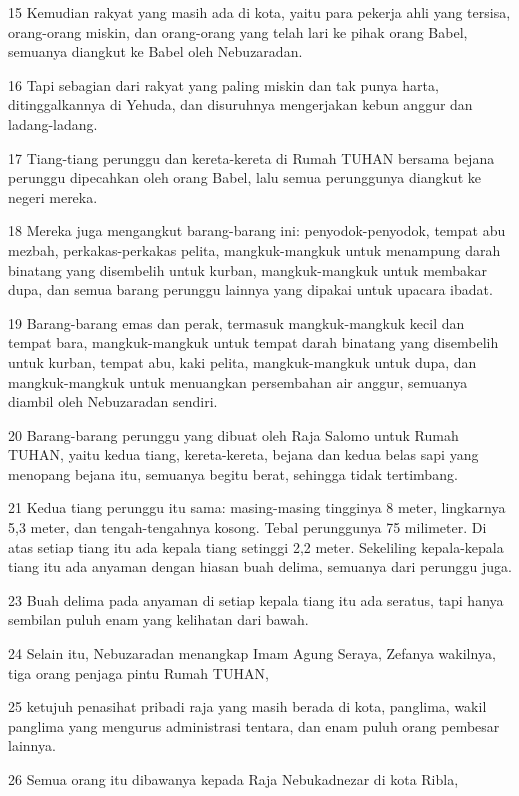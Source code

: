 \par 15 Kemudian rakyat yang masih ada di kota, yaitu para pekerja ahli yang tersisa, orang-orang miskin, dan orang-orang yang telah lari ke pihak orang Babel, semuanya diangkut ke Babel oleh Nebuzaradan.
\par 16 Tapi sebagian dari rakyat yang paling miskin dan tak punya harta, ditinggalkannya di Yehuda, dan disuruhnya mengerjakan kebun anggur dan ladang-ladang.
\par 17 Tiang-tiang perunggu dan kereta-kereta di Rumah TUHAN bersama bejana perunggu dipecahkan oleh orang Babel, lalu semua perunggunya diangkut ke negeri mereka.
\par 18 Mereka juga mengangkut barang-barang ini: penyodok-penyodok, tempat abu mezbah, perkakas-perkakas pelita, mangkuk-mangkuk untuk menampung darah binatang yang disembelih untuk kurban, mangkuk-mangkuk untuk membakar dupa, dan semua barang perunggu lainnya yang dipakai untuk upacara ibadat.
\par 19 Barang-barang emas dan perak, termasuk mangkuk-mangkuk kecil dan tempat bara, mangkuk-mangkuk untuk tempat darah binatang yang disembelih untuk kurban, tempat abu, kaki pelita, mangkuk-mangkuk untuk dupa, dan mangkuk-mangkuk untuk menuangkan persembahan air anggur, semuanya diambil oleh Nebuzaradan sendiri.
\par 20 Barang-barang perunggu yang dibuat oleh Raja Salomo untuk Rumah TUHAN, yaitu kedua tiang, kereta-kereta, bejana dan kedua belas sapi yang menopang bejana itu, semuanya begitu berat, sehingga tidak tertimbang.
\par 21 Kedua tiang perunggu itu sama: masing-masing tingginya 8 meter, lingkarnya 5,3 meter, dan tengah-tengahnya kosong. Tebal perunggunya 75 milimeter. Di atas setiap tiang itu ada kepala tiang setinggi 2,2 meter. Sekeliling kepala-kepala tiang itu ada anyaman dengan hiasan buah delima, semuanya dari perunggu juga.
\par 23 Buah delima pada anyaman di setiap kepala tiang itu ada seratus, tapi hanya sembilan puluh enam yang kelihatan dari bawah.
\par 24 Selain itu, Nebuzaradan menangkap Imam Agung Seraya, Zefanya wakilnya, tiga orang penjaga pintu Rumah TUHAN,
\par 25 ketujuh penasihat pribadi raja yang masih berada di kota, panglima, wakil panglima yang mengurus administrasi tentara, dan enam puluh orang pembesar lainnya.
\par 26 Semua orang itu dibawanya kepada Raja Nebukadnezar di kota Ribla,
